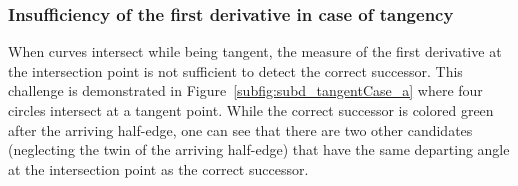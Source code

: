 
\subsubsection{Insufficiency of the first derivative in case of tangency}

When curves intersect while being tangent, the measure of the first derivative at the intersection point is not sufficient to detect the correct successor.
This challenge is demonstrated in Figure~\ref{subfig:subd_tangentCase_a} where four circles intersect at a tangent point.
While the correct successor is colored green after the arriving half-edge, one can see that there are two other candidates (neglecting the twin of the arriving half-edge) that have the same departing angle at the intersection point as the correct successor.\bigskip

